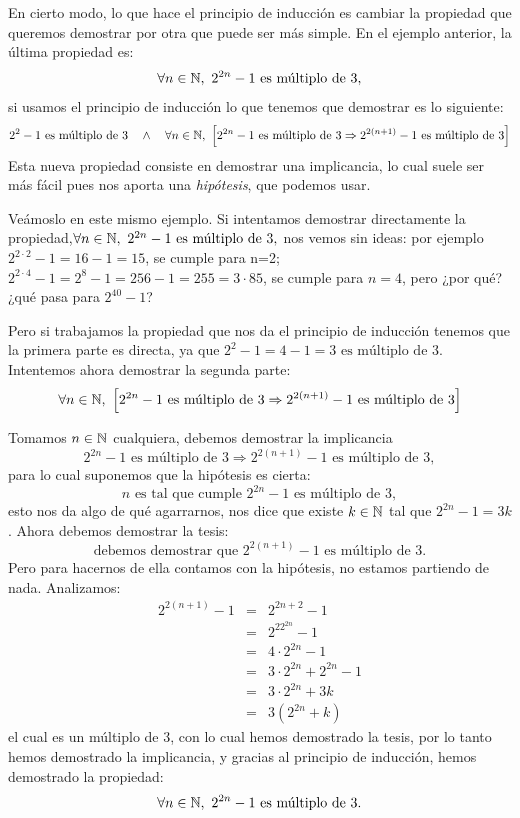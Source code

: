 \medskip

\begin{ejemplo}
En cierto modo, lo que hace el principio de inducción es cambiar la propiedad que queremos demostrar por otra que puede ser más simple. 
En el ejemplo anterior, la última propiedad es:
$$\forall n\in\mathbb{N},\ 2^{2n}-1 \textrm{ es múltiplo de }3,$$
si usamos el principio de inducción lo que tenemos que demostrar es lo siguiente:
$$2^{2}-1\textrm{ es múltiplo de }3\quad\wedge\quad \forall n\in\mathbb{N},\ \left[2^{2n}-1 \textrm{ es múltiplo de }3\Rightarrow 2^{2(n+1)}-1 \textrm{ es múltiplo de }3\right]$$
Esta nueva propiedad consiste en demostrar una implicancia, lo cual suele ser más fácil pues nos aporta una \emph{hipótesis}, que podemos usar.

Veámoslo en este mismo ejemplo.
Si intentamos demostrar directamente la propiedad,\break $\forall n\in\mathbb{N},\ 2^{2n}-1 \textrm{ es múltiplo de }3,$ nos vemos sin ideas: por ejemplo $2^{2\cdot2}-1=16-1=15$, se cumple para n=2; $2^{2\cdot 4}-1=2^8-1=256-1=255=3\cdot85$, se cumple para $n=4$, pero ¿por qué? ¿qué pasa para $2^{40}-1$?

Pero si trabajamos la propiedad que nos da el principio de inducción tenemos que la primera parte es directa, ya que $2^{2}-1=4-1=3\textrm{ es múltiplo de }3$.
Intentemos ahora demostrar la segunda parte: 
$$\forall n\in\mathbb{N},\ \left[2^{2n}-1 \textrm{ es múltiplo de }3\Rightarrow 2^{2(n+1)}-1 \textrm{ es múltiplo de }3\right]$$

Tomamos $n\in\mathbb{N}$ cualquiera, debemos demostrar la implicancia 
$$2^{2n}-1 \textrm{ es múltiplo de }3\Rightarrow 2^{2(n+1)}-1 \textrm{ es múltiplo de }3,$$
para lo cual suponemos que la hipótesis es cierta:
$$n\textrm{ es tal que cumple } 2^{2n}-1 \textrm{ es múltiplo de }3,$$
esto nos da algo de qué agarrarnos, nos dice que existe $k\in\mathbb{N}$ tal que $2^{2n}-1=3k$.
Ahora debemos demostrar la tesis: 
$$\textrm{debemos demostrar que }2^{2(n+1)}-1 \textrm{ es múltiplo de }3.$$
Pero para hacernos de ella contamos con la hipótesis, no estamos partiendo de nada.
Analizamos:
\begin{eqnarray*}
2^{2(n+1)}-1&=&2^{2n+2}-1\\
&=&2^22^{2n}-1\\
&=&4\cdot2^{2n}-1\\
&=&3\cdot2^{2n}+2^{2n}-1\\
&=&3\cdot2^{2n}+3k\\
&=&3(2^{2n}+k)
\end{eqnarray*}
el cual es un múltiplo de 3, con lo cual hemos demostrado la tesis, por lo tanto hemos demostrado la implicancia, y gracias al principio de inducción, hemos demostrado la propiedad: $$\forall n\in\mathbb{N},\ 2^{2n}-1 \textrm{ es múltiplo de }3.$$
\end{ejemplo}

